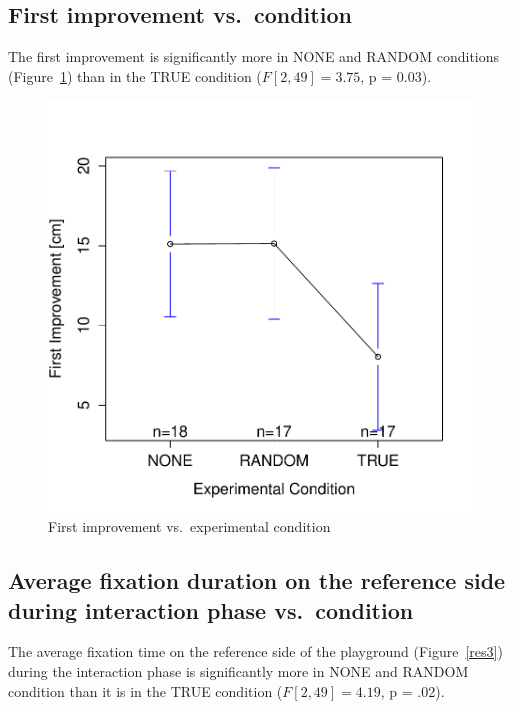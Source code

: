 \documentclass{sig-alternate}
\begin{document}
\subsection{First improvement vs.~condition}

The first improvement is significantly more in NONE and RANDOM
conditions (Figure~\ref{res2}) than in the TRUE condition ($F[2,49]=3.75$, p =
0.03).

\begin{figure}[h!]
    \centering
    \includegraphics[width=0.8\linewidth]{meanPlotFirstImprove}
    \caption{First improvement vs.~experimental condition}
    \label{res2}
\end{figure}

\subsection{Average fixation duration on the reference side during interaction
phase vs.~condition}

The average fixation time on the reference side of the playground
(Figure~\ref{res3}) during the interaction phase is significantly more in NONE
and RANDOM condition than it is in the TRUE condition ($F[2,49]=4.19$,
p = .02).
\end{document}
